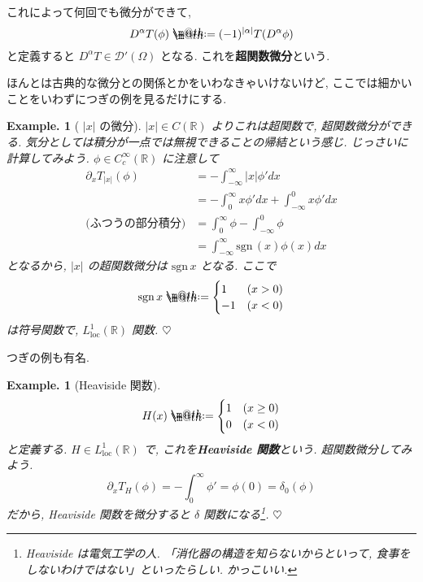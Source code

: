 \documentclass[openany, a4paper, oneside]{book}
\makeatletter
\newcommand*{\defeq}{\mathrel{\rlap{%
\raisebox{0.3ex}{$\m@th\cdot$}}%
\raisebox{-0.3ex}{$\m@th\cdot$}}%
=}
\theoremstyle{break}
\theoremstyle{breakdefn}
\newtheorem{ex}[thm]{Example.}
\newcommand{\abs}[1]{\left|#1\right|}
\newcommand{\Loneloc}{L_{\mathrm{loc}}^1}
\newcommand{\upbf}[1]{\textup{\textbf{#1}}}
\newcommand{\sgn}{\mathrm{sgn}\,}
\makeatother
\begin{document}
これによって何回でも微分ができて,
\begin{equation}
 D^{\alpha}T (\phi)
 \defeq
 (-1)^{|\alpha|}T (D^{\alpha}\phi)
\end{equation}
と定義すると $D^{\alpha}T \in \mathcal{D}'(\Omega)$ となる.
これを\textbf{超関数微分}という.

ほんとは古典的な微分との関係とかをいわなきゃいけないけど,
ここでは細かいことをいわずにつぎの例を見るだけにする.

\begin{ex}[ $\abs{x}$ の微分]
 $|x| \in C (\mathbb{R})$ よりこれは超関数で, 超関数微分ができる.
 気分としては積分が一点では無視できることの帰結という感じ.
 じっさいに計算してみよう.
 $\phi \in C_c^{\infty}(\mathbb{R})$ に注意して
 \begin{equation}
  \begin{split}
   \partial_x T_{|x|}(\phi)
   &=
   -\int_{-\infty}^{\infty}|x|\phi'dx \\
   &=
   -\int_0^{\infty}x\phi'dx + \int_{-\infty}^0x\phi'dx \\
   \text{(ふつうの部分積分)}
   &=
   \int_0^{\infty}\phi - \int_{-\infty}^0\phi \\
   &=
   \int_{-\infty}^{\infty} \sgn (x) \phi (x) dx
  \end{split}
 \end{equation}
となるから, $\abs{x}$ の超関数微分は $\sgn x$ となる.
ここで
\begin{equation}
 \sgn x
 \defeq
 \begin{cases}
  1 & (x > 0) \\
  -1 & (x < 0)
 \end{cases}
\end{equation}
は符号関数で, $\Loneloc (\mathbb{R})$ 関数.
$\heartsuit$
\end{ex}

つぎの例も有名.
\begin{ex}[Heaviside 関数]
 \begin{equation}
  H (x)
  \defeq
  \begin{cases}
   1 & (x \ge 0) \\
   0 & (x < 0)
  \end{cases}
 \end{equation}
 と定義する.
 $H \in \Loneloc (\mathbb{R})$ で, これを\upbf{Heaviside 関数}という.
 超関数微分してみよう.
 \begin{equation}
  \partial_x T_H (\phi)
  =
  -\int_0^{\infty}\phi'
  =
  \phi (0)
  =
  \delta_0 (\phi)
 \end{equation}
 だから, Heaviside 関数を微分すると $\delta$ 関数になる\footnote{Heaviside は電気工学の人.
「消化器の構造を知らないからといって, 食事をしないわけではない」といったらしい.
かっこいい.
 }.
 $\heartsuit$
\end{ex}
\end{document}
